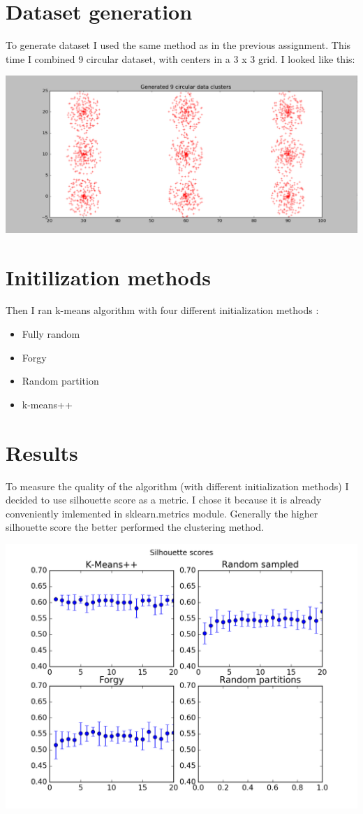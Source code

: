 \documentclass{article}
\begin{document}
\section{Dataset generation}
To generate dataset I used the same method as in the previous assignment. This time I combined 9 circular dataset, with centers in a 3 x 3 grid. I looked like this:

\includegraphics[width=\textwidth]{datasets}


\section{Initilization methods}
Then I ran k-means algorithm with four different initialization methods :

\begin{itemize}
  \item Fully random
  \item Forgy
  \item Random partition
  \item k-means++
\end{itemize}

\section{Results}

To measure the quality of the algorithm (with different initialization methods) I decided to use silhouette score
as a metric. I chose it because it is already conveniently imlemented in sklearn.metrics module.
Generally the higher silhouette score the better performed the clustering method.

\includegraphics[width=\textwidth]{clustering}
\end{document}
